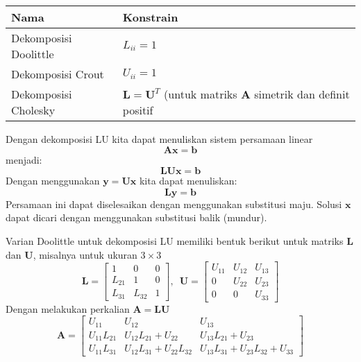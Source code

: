 \documentclass[11pt]{article}
\begin{document}
\begin{longtable}[]{@{}ll@{}}
\toprule
\begin{minipage}[b]{0.29\columnwidth}\raggedright
Nama\strut
\end{minipage} & \begin{minipage}[b]{0.65\columnwidth}\raggedright
Konstrain\strut
\end{minipage}\tabularnewline
\midrule
\endhead
\begin{minipage}[t]{0.29\columnwidth}\raggedright
Dekomposisi Doolittle\strut
\end{minipage} & \begin{minipage}[t]{0.65\columnwidth}\raggedright
\(L_{ii} = 1\)\strut
\end{minipage}\tabularnewline
\begin{minipage}[t]{0.29\columnwidth}\raggedright
Dekomposisi Crout\strut
\end{minipage} & \begin{minipage}[t]{0.65\columnwidth}\raggedright
\(U_{ii} = 1\)\strut
\end{minipage}\tabularnewline
\begin{minipage}[t]{0.29\columnwidth}\raggedright
Dekomposisi Cholesky\strut
\end{minipage} & \begin{minipage}[t]{0.65\columnwidth}\raggedright
\(\mathbf{L} = \mathbf{U}^{T}\) (untuk matriks \(\mathbf{A}\) simetrik
dan definit positif\strut
\end{minipage}\tabularnewline
\bottomrule
\end{longtable}

    Dengan dekomposisi LU kita dapat menuliskan sistem persamaan linear \[
\mathbf{Ax} = \mathbf{b}
\] menjadi: \[
\mathbf{LUx} = \mathbf{b}
\] Dengan menggunakan \(\mathbf{y} = \mathbf{Ux}\) kita dapat
menuliskan: \[
\mathbf{Ly} = \mathbf{b}
\] Persamaan ini dapat diselesaikan dengan menggunakan substitusi maju.
Solusi \(\mathbf{x}\) dapat dicari dengan menggunakan substitusi balik
(mundur).

    Varian Doolittle untuk dekomposisi LU memiliki bentuk berikut untuk
matriks \(\mathbf{L}\) dan \(\mathbf{U}\), misalnya untuk ukuran
\(3\times3\) \[
\mathbf{L} =
\begin{bmatrix}
1 & 0 & 0 \\
L_{21} & 1 & 0 \\
L_{31} & L_{32} & 1
\end{bmatrix},\,\,\,
\mathbf{U} =
\begin{bmatrix}
U_{11} & U_{12} & U_{13} \\
0 & U_{22} & U_{23} \\
0 & 0 & U_{33}
\end{bmatrix}
\] Dengan melakukan perkalian \(\mathbf{A} = \mathbf{LU}\) \[
\mathbf{A} = \begin{bmatrix}
U_{11} & U_{12} & U_{13} \\
U_{11}L_{21} & U_{12}L_{21} + U_{22} & U_{13}L_{21} + U_{23} \\
U_{11}L_{31} & U_{12}L_{31} + U_{22}L_{32} & U_{13}L_{31} + U_{23}L_{32} + U_{33}
\end{bmatrix}
\]
\end{document}
